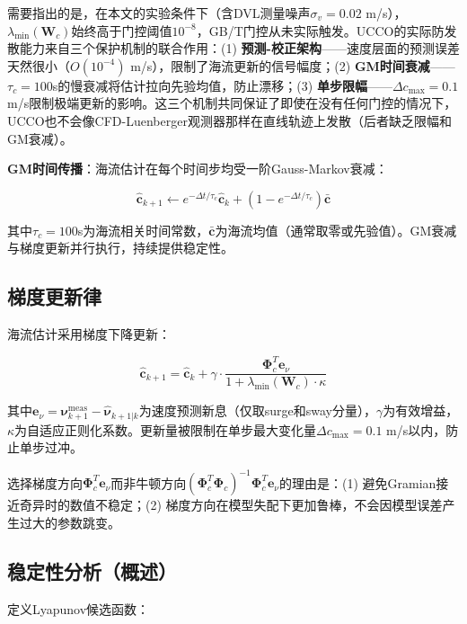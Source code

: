 需要指出的是，在本文的实验条件下（含DVL测量噪声$\sigma_v=0.02$ m/s），$\lambda_{\min}(\bm{W}_c)$始终高于门控阈值$10^{-8}$，GB/T门控从未实际触发。UCCO的实际防发散能力来自三个保护机制的联合作用：(1) \textbf{预测-校正架构}——速度层面的预测误差天然很小（$O(10^{-4})$ m/s），限制了海流更新的信号幅度；(2) \textbf{GM时间衰减}——$\tau_c=100$s的慢衰减将估计拉向先验均值，防止漂移；(3) \textbf{单步限幅}——$\Delta c_{\max}=0.1$ m/s限制极端更新的影响。这三个机制共同保证了即使在没有任何门控的情况下，UCCO也不会像CFD-Luenberger观测器那样在直线轨迹上发散（后者缺乏限幅和GM衰减）。

\textbf{GM时间传播}：海流估计在每个时间步均受一阶Gauss-Markov衰减：

\begin{equation}
    \hat{\bm{c}}_{k+1} \leftarrow e^{-\Delta t/\tau_c}\hat{\bm{c}}_k + (1-e^{-\Delta t/\tau_c})\bar{\bm{c}}
    \label{eq:gm}
\end{equation}

其中$\tau_c=100$s为海流相关时间常数，$\bar{\bm{c}}$为海流均值（通常取零或先验值）。GM衰减与梯度更新并行执行，持续提供稳定性。

\subsection{梯度更新律}

海流估计采用梯度下降更新：

\begin{equation}
    \hat{\bm{c}}_{k+1} = \hat{\bm{c}}_k + \gamma \cdot \frac{\bm{\Phi}_c^T \bm{e}_{\nu}}{1 + \lambda_{\min}(\bm{W}_c) \cdot \kappa}
    \label{eq:update}
\end{equation}

其中$\bm{e}_{\nu} = \bm{\nu}_{k+1}^{\text{meas}} - \hat{\bm{\nu}}_{k+1|k}$为速度预测新息（仅取surge和sway分量），$\gamma$为有效增益，$\kappa$为自适应正则化系数。更新量被限制在单步最大变化量$\Delta c_{\max}=0.1$ m/s以内，防止单步过冲。

选择梯度方向$\bm{\Phi}_c^T\bm{e}_{\nu}$而非牛顿方向$(\bm{\Phi}_c^T\bm{\Phi}_c)^{-1}\bm{\Phi}_c^T\bm{e}_{\nu}$的理由是：(1) 避免Gramian接近奇异时的数值不稳定；(2) 梯度方向在模型失配下更加鲁棒，不会因模型误差产生过大的参数跳变。

\subsection{稳定性分析（概述）}

定义Lyapunov候选函数：

